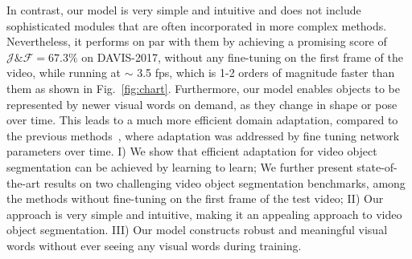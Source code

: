 \documentclass[10pt,twocolumn,letterpaper]{article}
\begin{document}
In contrast, our model is very simple and intuitive and does not include sophisticated modules that are often incorporated in more complex methods. Nevertheless, it performs on par with them by achieving a promising score of $\mathcal{J}\&\mathcal{F}=67.3\%$ on DAVIS-2017, without any fine-tuning on the first frame of the video, while running at $\sim$ 3.5 fps, which is 1-2 orders of magnitude faster than them as shown in Fig.~\ref{fig:chart}. 
Furthermore, our model enables objects to be represented by newer visual words on demand, as they change in shape or pose over time. This leads to a much more efficient domain adaptation, compared to the previous methods~\cite{onavos}, where adaptation was addressed by fine tuning network parameters over time.
I) We show that efficient adaptation for video object segmentation can be achieved by learning to learn;
 We further present state-of-the-art results on two challenging video object segmentation benchmarks, among the methods without fine-tuning on the first frame of the test video;
II) Our approach is very simple and intuitive, making it an appealing approach to video object segmentation.
III) Our model constructs robust and meaningful visual words without ever seeing any visual words during training.
\end{document}
